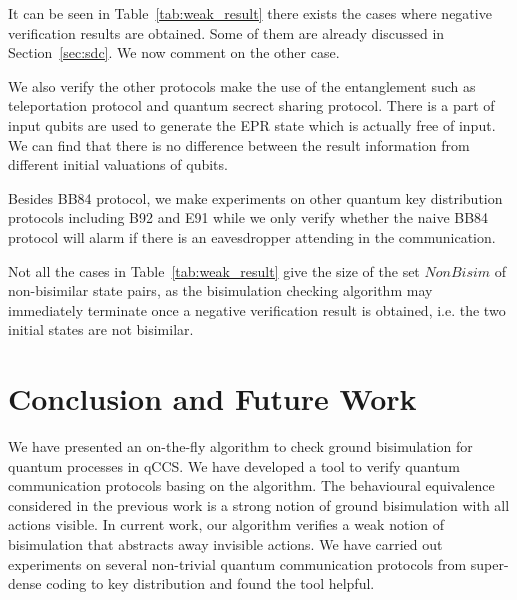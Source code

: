 \documentclass[a4paper,runningheads]{llncs}
\begin{document}
It can be seen in Table~\ref{tab:weak_result} there exists the cases where negative verification results are obtained. Some of them are already discussed in Section~\ref{sec:sdc}. We now comment on the other case.

We also verify the other protocols make the use of the entanglement such as teleportation protocol and quantum secrect sharing protocol. There is a part of input qubits are used to generate the EPR state which is actually free of input. We can find that there is no difference between the result information from different initial valuations of qubits.

Besides BB84 protocol, we make experiments on other quantum key distribution protocols including B92 and E91 while we only verify whether the naive BB84 protocol will alarm if there is an eavesdropper attending in the communication.

Not all the cases in Table~\ref{tab:weak_result} give the size of the set $NonBisim$ of non-bisimilar state pairs, as the bisimulation checking algorithm may immediately terminate once a negative verification result is obtained, i.e. the two initial states are not bisimilar. 

\section{Conclusion and Future Work}\label{sec:con}
We have presented an on-the-fly algorithm to check ground bisimulation for quantum processes in qCCS. We have developed a tool to verify quantum communication protocols basing on the algorithm. The behavioural equivalence considered in the previous work is a strong notion of ground bisimulation with all actions visible. In current work, our algorithm verifies a weak notion of bisimulation that abstracts away invisible actions. We have carried out experiments on several non-trivial quantum communication protocols from super-dense coding to key distribution and found the tool helpful.
\end{document}
